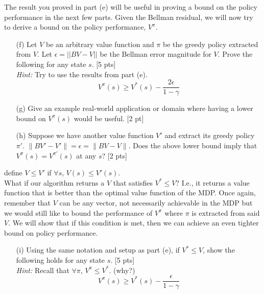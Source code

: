 \noindent The result you proved in part (e) will be useful in proving a bound on the policy performance in the next few parts. Given the Bellman residual, we will now try to derive a bound on the policy performance, $V^\pi$.

\begin{enumerate}
    \item[(f)] Let $V$ be an arbitrary value function and $\pi$ be the greedy policy extracted from $V$. Let $\epsilon = ||BV-V||$ be the Bellman error magnitude for $V$. Prove the following for any state $s$. [5 pts]\\
    \textit{Hint:} Try to use the results from part (e).
    \begin{equation}
        V^\pi(s) \geq V^*(s) - \frac{2\epsilon}{1-\gamma}
    \end{equation}
        \item[(g)] Give an example real-world application or domain where having a lower bound on $V^\pi(s)$ would be useful. [2 pt]

    \item[(h)] Suppose we have another value function $V'$ and extract its greedy policy $\pi'$.  $\|B V' - V' \| = \epsilon = \|B V - V\|$. Does the above lower bound imply that $V^\pi(s) = V^{\pi'}(s)$ at any $s$? [2 pts]

\end{enumerate}

 define $V \leq V'$ if $\forall s$, $V(s) \leq V'(s)$. 
\\



\noindent What if our algorithm returns a $V$ that satisfies $V^* \leq V$? I.e., it returns a value function that is better than the optimal value function of the MDP. Once again, remember that $V$ can be any vector, not necessarily achievable in the MDP but we would still like to bound the performance of $V^\pi$ where $\pi$ is extracted from said $V$. We will show that if this condition is met, then we can achieve an even tighter bound on policy performance.



\begin{enumerate}
    \item[(i)] Using the same notation and setup as part (e), if $V^* \leq V$, show the following holds for any state $s$. [5 pts]\\
    \textit{Hint:} Recall that $\forall \pi$, $V^\pi \leq V^*$. (why?)
    \begin{equation}
        V^\pi(s) \geq V^*(s) - \frac{\epsilon}{1-\gamma}
    \end{equation}
\end{enumerate}

